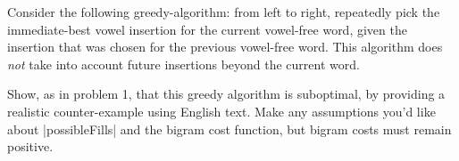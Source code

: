 \item {}
Consider the following greedy-algorithm: from left to right, repeatedly pick the
immediate-best vowel insertion for the current vowel-free word, given the
insertion that was chosen for the previous vowel-free word. This algorithm does
{\em not} take into account future insertions beyond the current word.

Show, as in problem 1, that this greedy algorithm is suboptimal, by providing a
realistic counter-example using English text. Make any assumptions you'd like
about |possibleFills| and the bigram cost function, but bigram costs must remain
positive.
